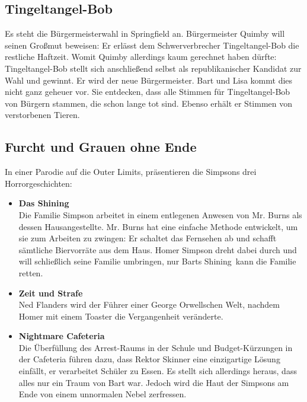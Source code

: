 \subsection{Tingeltangel-Bob}\label{2F02}
Es steht die Bürgermeisterwahl in Springfield an. Bürgermeister Quimby will seinen Großmut beweisen: Er erlässt dem Schwerverbrecher Tingeltangel-Bob die restliche Haftzeit. Womit Quimby allerdings kaum gerechnet haben dürfte: Tingeltangel-Bob stellt sich anschließend selbst als republikanischer Kandidat zur Wahl und gewinnt. Er wird der neue Bürgermeister. Bart und Lisa kommt dies nicht ganz geheuer vor. Sie entdecken, dass alle Stimmen für Tingeltangel-Bob von Bürgern stammen, die schon lange tot sind. Ebenso erhält er Stimmen von verstorbenen Tieren.

	
\subsection{Furcht und Grauen ohne Ende}\label{2F03}
In einer Parodie auf die \glqq Outer Limits\grqq , präsentieren die Simpsons drei Horrorgeschichten:
\begin{itemize}
	\item \textbf{Das Shining}\\ Die Familie Simpson arbeitet in einem entlegenen Anwesen von Mr. Burns als dessen Hausangestellte. Mr. Burns hat eine einfache Methode entwickelt, um sie zum Arbeiten zu zwingen: Er schaltet das Fernsehen ab und schafft sämtliche Biervorräte aus dem Haus. Homer Simpson dreht dabei durch und will schließlich seine Familie umbringen, nur Barts \glqq Shining\grqq\ kann die Familie retten.
	\item \textbf{Zeit und Strafe}\\ Ned Flanders wird der Führer einer George Orwellschen Welt, nachdem Homer mit einem Toaster die Vergangenheit veränderte.
	\item \textbf{Nightmare Cafeteria}\\ Die Überfüllung des Arrest-Raums in der Schule und Budget-Kürzungen in der Cafeteria führen dazu, dass Rektor Skinner eine einzigartige Lösung einfällt, er verarbeitet Schüler zu Essen. Es stellt sich allerdings heraus, dass alles nur ein Traum von Bart war. Jedoch wird die Haut der Simpsons am Ende von einem unnormalen Nebel zerfressen.
\end{itemize}

